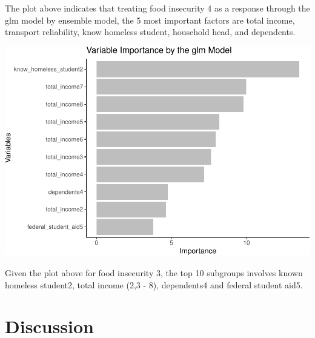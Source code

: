 \documentclass[
  10pt,
]{article}
\begin{document}
The plot above indicates that treating food insecurity 4 as a response through the glm model by ensemble model, the 5 most important factors are total income, transport reliability, know homeless student, household head, and dependents.\\

\begin{center}\includegraphics{phase2_report_files/figure-latex/unnamed-chunk-32-1} \end{center}

Given the plot above for food insecurity 3, the top 10 subgroups involves known homeless student2, total income (2,3 - 8), dependents4 and federal student aid5.

\hypertarget{discussion}{%
\section{Discussion}\label{discussion}}
\end{document}

